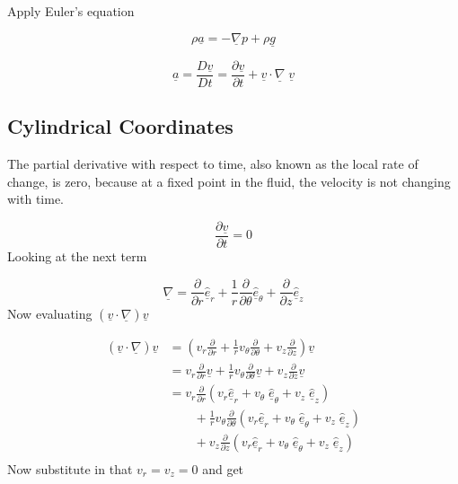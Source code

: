 Apply Euler's equation

\begin{equation*}
  \rho\underline{a}=-\underline{\nabla}p+\rho\underline{g}
\end{equation*}

\begin{equation*}
  \underline{a}=\frac{D\underline{v}}{Dt}=\frac{\partial\underline{v}}{\partial{}t}+\underline{v}\cdot\underline{\nabla}\;\underline{v}
\end{equation*}

\subsection{Cylindrical Coordinates}

The partial derivative with respect to time, also known as the local rate of change, is zero, because at a fixed point in the fluid, the velocity is not changing with time.

\begin{equation*}
  \frac{\partial\underline{v}}{\partial{}t}=0
\end{equation*}
Looking at the next term

\begin{equation*}
  \underline{\nabla}=\frac{\partial}{\partial{}r}\hat{\underline{e}}_{r}+\frac{1}{r}\frac{\partial}{\partial\theta}\hat{\underline{e}}_{\theta}+\frac{\partial}{\partial{}z}\hat{\underline{e}}_{z}
\end{equation*}
Now evaluating $(\underline{v}\cdot\underline{\nabla})\underline{v}$

\begin{equation*}
  \begin{split}
    (\underline{v}\cdot\underline{\nabla})\underline{v}&=
    \left(v_{r}\frac{\partial}{\partial{}r}+
    \frac{1}{r}v_{\theta}\frac{\partial}{\partial\theta}+
    v_{z}\frac{\partial}{\partial{}z}\right)\underline{v} \\
    &=v_{r}\frac{\partial}{\partial{}r}\underline{v}+
    \frac{1}{r}v_{\theta}\frac{\partial}{\partial\theta}\underline{v}+
    v_{z}\frac{\partial}{\partial{}z}\underline{v} \\
    &=v_{r}\frac{\partial}{\partial{}r}(v_{r}\hat{\underline{e}}_{r}+v_{\theta}\;\hat{\underline{e}}_{\theta}+v_{z}\;\hat{\underline{e}}_{z}) \\
    &\qquad+\frac{1}{r}v_{\theta}\frac{\partial}{\partial\theta}(v_{r}\hat{\underline{e}}_{r}+v_{\theta}\;\hat{\underline{e}}_{\theta}+v_{z}\;\hat{\underline{e}}_{z}) \\
    &\qquad+v_{z}\frac{\partial}{\partial{}z}(v_{r}\hat{\underline{e}}_{r}+v_{\theta}\;\hat{\underline{e}}_{\theta}+v_{z}\;\hat{\underline{e}}_{z}) \\
  \end{split}
\end{equation*}
Now substitute in that $v_{r}=v_{z}=0$ and get

